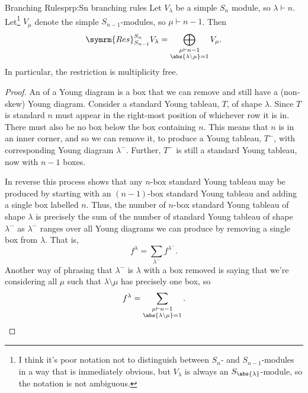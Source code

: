 \documentclass[fleqn]{NotesClass}
\newcommand{\partition}{\vdash}
\newcommand{\Res}{\symrm{Res}}
\begin{document}
    
    \begin{prp}{Branching Rules}{prp:Sn branching rules}
        Let \(V_\lambda\) be a simple \(S_n\) module, so \(\lambda \partition n\).
        Let\footnote{I think it's poor notation not to distinguish between \(S_n\)- and \(S_{n-1}\)-modules in a way that is immediately obvious, but \(V_\lambda\) is always an \(S_{\abs{\lambda}}\)-module, so the notation is not ambiguous.} \(V_\mu\) denote the simple \(S_{n-1}\)-modules, so \(\mu \partition n-1\).
        Then
        \begin{equation}
            \Res^{S_n}_{S_{n-1}} V_\lambda = \bigoplus_{\substack{\mu \partition n-1\\ \abs{\lambda\setminus \mu} = 1}} V_\mu.
        \end{equation}
        In particular, the restriction is multiplicity free.
        \begin{proof}
            An  of a Young diagram is a box that we can remove and still have a (non-skew) Young diagram.
            Consider a standard Young tableau, \(T\), of shape \(\lambda\).
            Since \(T\) is standard \(n\) must appear in the right-most position of whichever row it is in.
            There must also be no box below the box containing \(n\).
            This means that \(n\) is in an inner corner, and so we can remove it, to produce a Young tableau, \(T^-\), with corresponding Young diagram \(\lambda^-\).
            Further, \(T^-\) is still a standard Young tableau, now with \(n-1\) boxes.
            
            In reverse this process shows that any \(n\)-box standard Young tableau may be produced by starting with an \((n-1)\)-box standard Young tableau and adding a single box labelled \(n\).
            Thus, the number of \(n\)-box standard Young tableau of shape \(\lambda\) is precisely the sum of the number of standard Young tableau of shape \(\lambda^-\) as \(\lambda^-\) ranges over all Young diagrams we can produce by removing a single box from \(\lambda\).
            That is,
            \begin{equation}
                f^\lambda = \sum_{\lambda^-} f^{\lambda^-}.
            \end{equation}
            Another way of phrasing that \(\lambda^-\) is \(\lambda\) with a box removed is saying that we're considering all \(\mu\) such that \(\lambda\setminus \mu\) has precisely one box, so
            \begin{equation}
                \label{eqn:number of standard lambda tableaux from number of standard tableaux of one box fewer}
                f^\lambda = \sum_{\substack{\mu \partition n-1\\ \abs{\lambda\setminus \mu} = 1}}.
            \end{equation}
            

\end{proof}
\end{prp}
\end{document}
